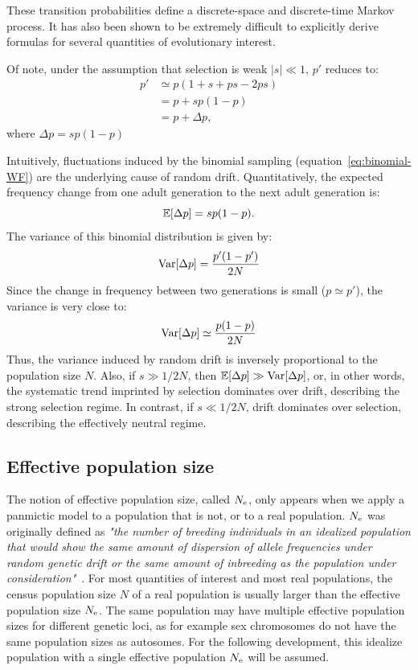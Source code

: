 These transition probabilities define a discrete-space and discrete-time Markov process.
It has also been shown to be extremely difficult to explicitly derive formulas for several quantities of evolutionary interest.

Of note, under the assumption that selection is weak $|s| \ll 1$, $p'$ reduces to:
\begin{align}
    p' & \simeq p (1 + s + ps - 2ps) \\
    & = p + sp(1-p) \\
    & = p + \Delta p,
\end{align}
where $\Delta p = sp(1-p)$

Intuitively, fluctuations induced by the binomial sampling (equation~\ref{eq:binomial-WF}) are the underlying cause of random drift.
Quantitatively, the expected frequency change from one adult generation to the next adult generation is:
\begin{equation}
    \operatorname{\mathbb{E}}[\Delta p] = s p (1-p).
\end{equation}
The variance of this binomial distribution is given by:
\begin{equation}
    \operatorname{\text{Var}}[\Delta p] = \frac{p' (1-p')}{2N}
\end{equation}
Since the change in frequency between two generations is small ($p \simeq p'$), the variance is very close to:
\begin{equation}
    \operatorname{\text{Var}}[\Delta p] \simeq \frac{p (1-p)}{2N}
\end{equation}
Thus, the variance induced by random drift is inversely proportional to the population size $N$.
Also, if $s \gg 1/2N$, then $\operatorname{\mathbb{E}}[\Delta p] \gg \operatorname{\text{Var}}[\Delta p]$, or, in other words, the systematic trend imprinted by selection dominates over drift, describing the strong selection regime.
In contrast, if $s \ll 1 / 2N$, drift dominates over selection, describing the effectively \gls{neutral} regime.

\subsection{Effective population size}

The notion of \gls{effective population size}, called $N_{\text{e}}$, only appears when we apply a panmictic model to a population that is not, or to a real population.
$N_{\text{e}}$ was originally defined as \textit{"the number of breeding individuals in an idealized population that would show the same amount of dispersion of \gls{allele} frequencies under random \gls{genetic drift} or the same amount of inbreeding as the population under consideration"}~\citep{wright_evolution_1931}.
For most quantities of interest and most real populations, the census population size $N$ of a real population is usually larger than the \gls{effective population size} $N_{\text{e}}$.
The same population may have multiple \glspl{effective population size} for different genetic loci, as for example sex chromosomes do not have the same population sizes as autosomes.
For the following development, this idealize population with a single effective population $N_{\text{e}}$ will be assumed.


